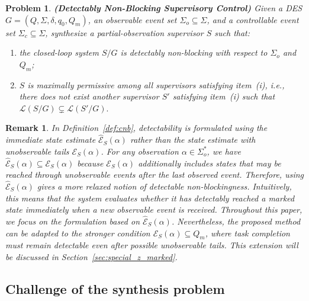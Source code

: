 \documentclass[twocolumn]{autart}
\newtheorem{myprob}{\bf Problem}
\newtheorem{remark}{Remark}
\begin{document}
\begin{myprob}%
\label{prob:cnb}
\textbf{\textup{(Detectably Non-Blocking Supervisory Control)}}
Given a DES $G = (Q, \Sigma, \delta, q_0, Q_m)$, an observable event set $\Sigma_o \subseteq \Sigma$, and a controllable event set $\Sigma_c \subseteq \Sigma$, synthesize a partial-observation supervisor $S$ such that:
\begin{enumerate} 
\item the closed-loop system $S/G$ is detectably non-blocking with respect to $\Sigma_o$ and $Q_m$;
\item $S$ is maximally permissive among all supervisors satisfying item~(i), i.e., there does not exist another supervisor $S'$ satisfying item~(i) such that
$\mathcal{L}(S/G) \subsetneq \mathcal{L}(S'/G).$
\end{enumerate}
\end{myprob}
\medskip 

\begin{remark}
In Definition~\ref{def:cnb}, detectability is formulated using the immediate state estimate $\hat{\mathcal{E}}_S(\alpha)$ rather than the state estimate with unobservable tails $\mathcal{E}_S(\alpha)$.
For any observation $\alpha \in \Sigma_o^*$, we have $\hat{\mathcal{E}}_S(\alpha) \subseteq \mathcal{E}_S(\alpha)$ 
because $\mathcal{E}_S(\alpha)$ additionally includes states that may be reached through unobservable events after the last observed event.
Therefore, using $\hat{\mathcal{E}}_S(\alpha)$ gives a more relaxed notion of detectable non-blockingness.
Intuitively, this means that the system evaluates whether it has detectably reached a marked state immediately when a new observable event is received.
Throughout this paper, we focus on the formulation based on $\hat{\mathcal{E}}_S(\alpha)$.
Nevertheless, the proposed method can be adapted to the stronger condition $\mathcal{E}_S(\alpha) \subseteq Q_m$, where task completion must remain detectable even after possible unobservable tails.
This extension will be discussed in Section~\ref{sec:special_z_marked}.
\end{remark}
 


\subsection{Challenge of the synthesis problem}
\end{document}
